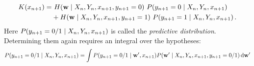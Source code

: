 \begin{align}
	K(x_{n+1}) =&~ H({\bf w} \mid X_n, Y_n, x_{n+1}, y_{n+1} = 0) ~
	{P(y_{n+1} = 0 \mid X_n, Y_n, x_{n+1})} \\
	&+
	H({\bf w} \mid X_n, Y_n, x_{n+1}, y_{n+1} = 1) ~
	{P(y_{n+1} = 1 \mid X_n, Y_n, x_{n+1})} \,.
\end{align}
Here ${P(y_{n+1} = 0/1 \mid X_n, Y_n, x_{n+1})}$ is called the \emph{predictive distribution}. Determining them again requires an integral over the hypotheses:
\begin{align}
	{P(y_{n+1} = 0/1 \mid X_n, Y_n, x_{n+1})}
	= \int {P(y_{n+1} = 0/1 \mid {\bf w}', x_{n+1})} {P({\bf w}' \mid X_n, Y_n, x_{n+1}, y_{n+1} = 0/1)} \,\mathrm{d} {\bf w}'
\end{align}
